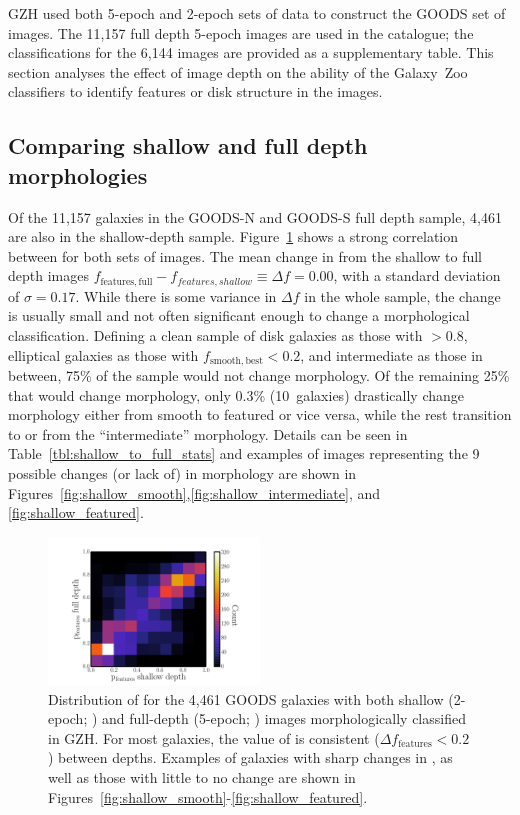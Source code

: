 \documentclass[a4paper,fleqn,usenatbib]{mnras}
\begin{document}
GZH used both 5-epoch and 2-epoch sets of data to construct the GOODS set of
images. The 11,157 full depth 5-epoch images are used in the \main{} catalogue; the
classifications for the 6,144 \goods{} images are provided as a
supplementary table. This section analyses the effect of image depth on the
ability of the Galaxy~Zoo classifiers to identify features or disk structure in the images. 

\subsection{Comparing shallow and full depth morphologies}\label{ssec:depth_comparison}

Of the 11,157 galaxies in the GOODS-N and GOODS-S full depth sample, 4,461
are also in the shallow-depth sample. Figure~\ref{fig:shallow_vs_full} shows a
strong correlation between \ffeatures{} for both sets of images. The mean
change in \ffeatures{} from the shallow to full depth images
$f_\mathrm{features,full} - f_{features,shallow} \equiv \Delta f = 0.00$, with
a standard deviation of $\sigma = 0.17$. While there is some variance in
$\Delta f$ in the whole sample, the change is usually small and not often
significant enough to change a morphological classification. Defining a clean
sample of disk galaxies as those with \fbest$>0.8$, elliptical galaxies as
those with $f_\mathrm{smooth,best}<0.2$, and intermediate as those in between,
75\% of the sample would not change morphology. Of the remaining 25\% that
would change morphology, only 0.3\% (10~galaxies)
drastically change morphology either from smooth to featured or vice versa, while the
rest transition to or from the ``intermediate'' morphology. Details can
be seen in Table~\ref{tbl:shallow_to_full_stats} and examples of images
representing the 9 possible changes (or lack of) in morphology are shown in
Figures~\ref{fig:shallow_smooth},\ref{fig:shallow_intermediate}, and
\ref{fig:shallow_featured}.

\begin{figure}
\begin{center}
\includegraphics[width=0.50\textwidth]{figures/full_shallow_p_plot.pdf}
\caption{Distribution of \ffeatures{} for the 4,461 GOODS galaxies with both
shallow (2-epoch; \goods) and full-depth (5-epoch; \main) images
morphologically classified in GZH. For most galaxies, the value of \ffeatures{}
is consistent ($\Delta f_\mathrm{features}<0.2$) between depths. Examples of
galaxies with sharp changes in \ffeatures, as well as those with little to no
change are shown in
Figures~\ref{fig:shallow_smooth}-\ref{fig:shallow_featured}.}
\label{fig:shallow_vs_full}
\end{center}
\end{figure}
\end{document}
